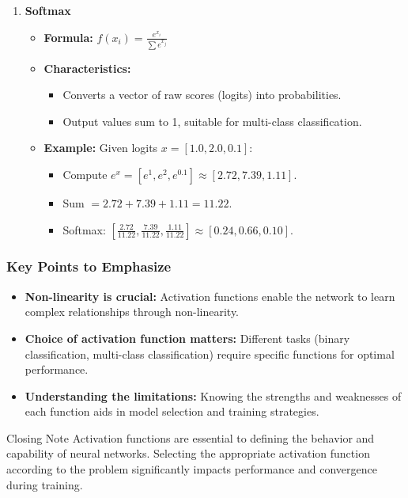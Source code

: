 \documentclass{beamer}
\begin{document}
\begin{frame}[fragile]
\begin{enumerate}
        \item \textbf{Softmax}
            \begin{itemize}
                \item \textbf{Formula:} $f(x_i) = \frac{e^{x_i}}{\sum e^{x_j}}$
                \item \textbf{Characteristics:}
                    \begin{itemize}
                        \item Converts a vector of raw scores (logits) into probabilities.
                        \item Output values sum to 1, suitable for multi-class classification.
                    \end{itemize}
                \item \textbf{Example:} Given logits $x = [1.0, 2.0, 0.1]$:
                    \begin{itemize}
                        \item Compute $e^x = [e^1, e^2, e^{0.1}] \approx [2.72, 7.39, 1.11]$.
                        \item Sum $= 2.72 + 7.39 + 1.11 = 11.22$.
                        \item Softmax: $[\frac{2.72}{11.22}, \frac{7.39}{11.22}, \frac{1.11}{11.22}] \approx [0.24, 0.66, 0.10]$.
                    \end{itemize}
            \end{itemize}
    \end{enumerate}
\end{frame}

\begin{frame}[fragile]
    \frametitle{Key Points to Emphasize}
    \begin{itemize}
        \item \textbf{Non-linearity is crucial:} Activation functions enable the network to learn complex relationships through non-linearity.
        \item \textbf{Choice of activation function matters:} Different tasks (binary classification, multi-class classification) require specific functions for optimal performance.
        \item \textbf{Understanding the limitations:} Knowing the strengths and weaknesses of each function aids in model selection and training strategies.
    \end{itemize}
    
    \begin{block}{Closing Note}
        Activation functions are essential to defining the behavior and capability of neural networks. 
        Selecting the appropriate activation function according to the problem significantly impacts performance and convergence during training.
    \end{block}
\end{frame}
\end{document}
